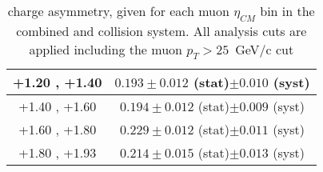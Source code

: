 \begin{table}[h!]
\begin{tabular}{|c|*1c|}
    \hline
    +1.20 , +1.40 & $0.193 \pm 0.012$ (stat)$ \pm 0.010$ (syst)\\
    \hline
    +1.40 , +1.60 & $0.194 \pm 0.012$ (stat)$ \pm 0.009$ (syst)\\
    \hline
    +1.60 , +1.80 & $0.229 \pm 0.012$ (stat)$ \pm 0.011$ (syst)\\
    \hline
    +1.80 , +1.93 & $0.214 \pm 0.015$ (stat)$ \pm 0.013$ (syst)\\
    \hline
  \end{tabular}
  \caption{\W charge asymmetry, given for each muon $\eta_{CM}$ bin in the combined \pPb and \Pbp collision system. All analysis cuts are applied including the muon $p_{T} > 25$~GeV/c cut}
  \label{tab:ChargeAsymmetrySyst_WToMu_PA}
\end{table}


